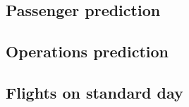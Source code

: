 	\subsection{Passenger prediction}

	
	
	
	
	
	
	\subsection{Operations prediction}
	\subsection{Flights on standard day}